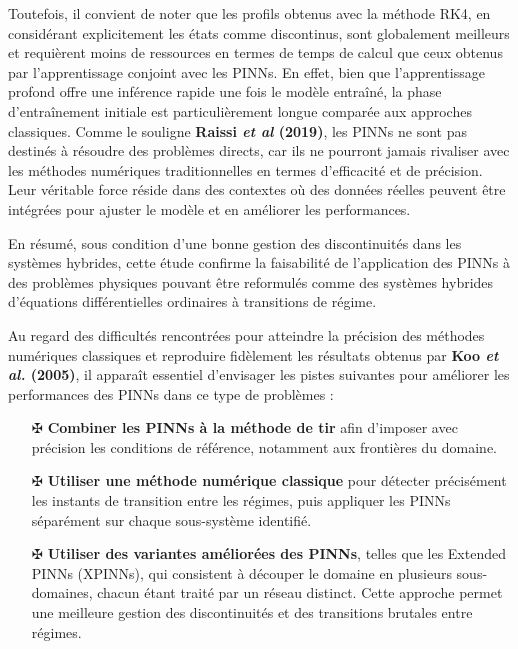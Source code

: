 \documentclass[12pt, oneside]{report} %
\theoremstyle{definition}
\theoremstyle{remark}
\begin{document}
Toutefois, il convient de noter que les profils obtenus avec la méthode RK4, en considérant explicitement les états comme discontinus, sont globalement meilleurs et requièrent moins de ressources en termes de temps de calcul que ceux obtenus par l’apprentissage conjoint avec les PINNs.  
En effet, bien que l’apprentissage profond offre une inférence rapide une fois le modèle entraîné, la phase d’entraînement initiale est particulièrement longue comparée aux approches classiques.
Comme le souligne \textbf{Raissi \textit{et al} (2019)}, les PINNs ne sont pas destinés à résoudre des problèmes directs, car ils ne pourront jamais rivaliser avec les méthodes numériques traditionnelles en termes d’efficacité et de précision.  
Leur véritable force réside dans des contextes où des données réelles peuvent être intégrées pour ajuster le modèle et en améliorer les performances.

En résumé, sous condition d’une bonne gestion des discontinuités dans les systèmes hybrides, cette étude confirme la faisabilité de l’application des PINNs à des problèmes physiques pouvant être reformulés comme des systèmes hybrides d’équations différentielles ordinaires à transitions de régime.

Au regard des difficultés rencontrées pour atteindre la précision des méthodes numériques classiques et reproduire fidèlement les résultats obtenus par \textbf{Koo \textit{et al.} (2005)}, il apparaît essentiel d’envisager les pistes suivantes pour améliorer les performances des PINNs dans ce type de problèmes :

\begin{itemize}
	\item[$\maltese$] \textbf{Combiner les PINNs à la méthode de tir} afin d’imposer avec précision les conditions de référence, notamment aux frontières du domaine.
	
	\item[$\maltese$] \textbf{Utiliser une méthode numérique classique} pour détecter précisément les instants de transition entre les régimes, puis appliquer les PINNs séparément sur chaque sous-système identifié.
	
	\item[$\maltese$] \textbf{Utiliser des variantes améliorées des PINNs}, telles que les {Extended PINNs} (XPINNs), qui consistent à découper le domaine en plusieurs sous-domaines, chacun étant traité par un réseau distinct.  
	Cette approche permet une meilleure gestion des discontinuités et des transitions brutales entre régimes.
\end{itemize}
\end{document}
